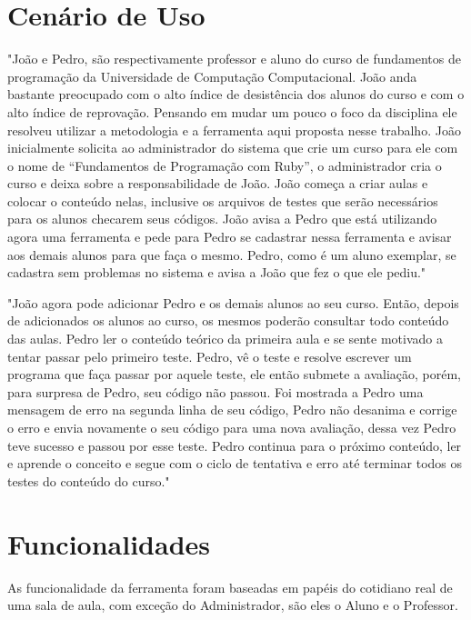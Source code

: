 \documentclass[pnumabnt,normaltoc,espacoumemeio,capchap]{abnt}
\begin{document}
\section{Cenário de Uso}
\par "João e Pedro, são respectivamente professor e aluno do curso de fundamentos de programação da Universidade de Computação Computacional. João anda bastante preocupado com o alto índice de desistência dos alunos do curso e com o alto índice de reprovação. Pensando em mudar um pouco o foco da disciplina ele resolveu utilizar a metodologia e a ferramenta aqui proposta nesse trabalho. João inicialmente solicita ao administrador do sistema que crie um curso para ele com o nome de “Fundamentos de Programação com Ruby”, o administrador cria o curso e deixa sobre a responsabilidade de João. João começa a criar aulas e colocar o conteúdo nelas, inclusive os arquivos de testes que serão necessários para os alunos checarem seus códigos. João avisa a Pedro que está utilizando agora uma ferramenta e pede para Pedro se cadastrar nessa ferramenta e avisar aos demais alunos para que faça o mesmo. Pedro, como é um aluno exemplar, se cadastra sem problemas no sistema e avisa a João que fez o que ele pediu." 
\par "João agora pode adicionar Pedro e os demais alunos ao seu curso. Então, depois de adicionados os alunos ao curso, os mesmos poderão consultar todo conteúdo das aulas. Pedro ler o conteúdo teórico da primeira aula e se sente motivado a tentar passar pelo primeiro teste. Pedro, vê o teste e resolve escrever um programa que faça passar por aquele teste, ele então submete a avaliação, porém, para surpresa de Pedro, seu código não passou. Foi mostrada a Pedro uma mensagem de erro na segunda linha de seu código, Pedro não desanima e corrige o erro e envia novamente o seu código para uma nova avaliação, dessa vez Pedro teve sucesso e passou por esse teste. Pedro continua para o próximo conteúdo, ler e aprende o conceito e segue com o ciclo de tentativa e erro até terminar todos os testes do conteúdo do curso."
\section{Funcionalidades}
\par As funcionalidade da ferramenta foram baseadas em papéis do cotidiano real de uma sala de aula, com exceção do Administrador, são eles o Aluno e o Professor.
\end{document}
